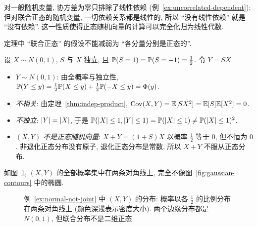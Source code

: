 \begin{intuition}
对一般随机变量, 协方差为零只排除了线性依赖 (例~\ref{ex:uncorrelated-dependent}); 但对联合正态的随机变量, 一切依赖关系都是线性的, 所以 ``没有线性依赖'' 就是 ``没有依赖''. 这一性质使得正态随机向量的计算可以完全化归为线性代数.
\end{intuition}

定理中 ``联合正态'' 的假设不能减弱为 ``各分量分别是正态的''.

\begin{example}[两个正态变量不相关却不独立]\label{ex:normal-not-joint}
设 $X\sim N(0,1)$, $S$ 与 $X$ 独立, 且 $\P(S=1)=\P(S=-1)=\frac{1}{2}$. 令 $Y=SX$.
\begin{itemize}
\item \emph{$Y\sim N(0,1)$}: 由全概率与独立性, $\P(Y\le y)=\frac{1}{2}\P(X\le y)+\frac{1}{2}\P(-X\le y)=\Phi(y)$.
\item \emph{不相关}: 由定理~\ref{thm:indep-product}, $\Cov(X,Y)=\E[SX^2]=\E[S]\E[X^2]=0$.
\item \emph{不独立}: $\abs{Y}=\abs{X}$, 于是 $\P(\abs{X}\le1,\abs{Y}\le1)=\P(\abs{X}\le1)\ne\P(\abs{X}\le1)^2$.
\item \emph{$(X,Y)$ 不是正态随机向量}: $X+Y=(1+S)X$ 以概率 $\frac{1}{2}$ 等于 $0$, 但不恒为 $0$. 非退化正态分布没有原子, 退化正态分布是常数, 所以 $X+Y$ 不服从正态分布.
\end{itemize}
如图~\ref{fig:normal-not-joint}, $(X,Y)$ 的全部概率集中在两条对角线上, 完全不像图~\ref{fig:gaussian-contours} 中的椭圆.
\end{example}

\begin{figure}[htbp]
\centering
{}
\caption{例~\ref{ex:normal-not-joint} 中 $(X,Y)$ 的分布: 概率以各 $\frac{1}{2}$ 的比例分布在两条对角线上 (颜色深浅表示密度大小). 两个边缘分布都是 $N(0,1)$, 但联合分布不是二维正态}
\label{fig:normal-not-joint}
\end{figure}

